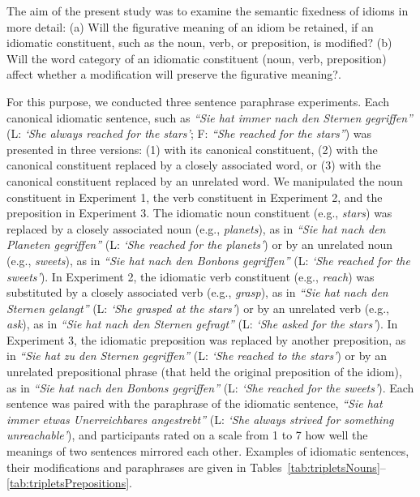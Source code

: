 \documentclass[output=paper]{langsci/langscibook}
\begin{document}
The aim of the present study was to examine the semantic fixedness of idioms in more detail: (a) Will the figurative meaning of an idiom be retained, if an idiomatic constituent, such as the noun, verb, or preposition, is modified?  (b) Will the word category of an idiomatic constituent (noun, verb, preposition) affect whether a modification will preserve the figurative meaning?. 

For this purpose, we conducted three sentence paraphrase experiments. Each canonical idiomatic sentence, such as \textit{``Sie hat immer nach den Sternen gegriffen''} (L: \textit{‘She always reached for the stars’}; F: \textit{``She reached for the stars''}) was presented in three versions: (1) with its canonical constituent, (2) with the canonical constituent replaced by a closely associated word, or (3) with the canonical constituent replaced by an unrelated word. We manipulated the noun constituent in Experiment 1, the verb constituent in Experiment 2, and the preposition in Experiment 3. The idiomatic noun constituent (e.g., \textit{stars}) was replaced by a closely associated noun (e.g., \textit{planets}), as in \textit{``Sie hat nach den Planeten gegriffen''} (L: \textit{‘She reached for the planets’}) or by an unrelated noun (e.g., \textit{sweets}), as in \textit{``Sie hat nach den Bonbons gegriffen''} (L: \textit{‘She reached for the sweets’}). In Experiment 2, the idiomatic verb constituent (e.g., \textit{reach}) was substituted by a closely associated verb (e.g., \textit{grasp}), as in \textit{``Sie hat nach den Sternen gelangt''} (L: \textit{‘She grasped at the stars’}) or by an unrelated verb (e.g., \textit{ask}), as in \textit{``Sie hat nach den Sternen gefragt''} (L: \textit{‘She asked for the stars’}). In Experiment 3, the idiomatic preposition was replaced by another preposition, as in \textit{``Sie hat zu den Sternen gegriffen''} (L: \textit{‘She reached to the stars’}) or by an unrelated prepositional phrase (that held the original preposition of the idiom), as in \textit{``Sie hat nach den Bonbons gegriffen''} (L: \textit{‘She reached for the sweets’}).  Each sentence was paired with the paraphrase of the idiomatic sentence, \textit{``Sie hat immer etwas Unerreichbares angestrebt''} (L: \textit{‘She always strived for something unreachable’}), and participants rated on a scale from 1 to 7 how well the meanings of two sentences mirrored each other. Examples of idiomatic sentences, their modifications and paraphrases are given in Tables~\ref{tab:tripletsNouns}--\ref{tab:tripletsPrepositions}.
\end{document}
